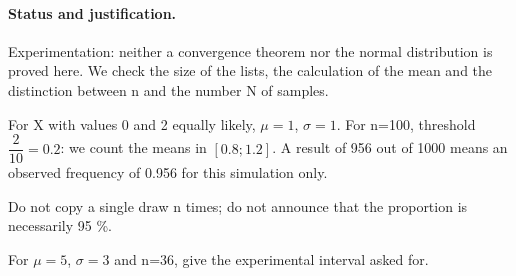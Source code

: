 \paragraph{Status and justification.} Experimentation: neither a convergence theorem nor the normal distribution is proved here. We check the size of the lists, the calculation of the mean and the distinction between n and the number N of samples.
\begin{example}For X with values 0 and 2 equally likely, $\mu=1$, $\sigma=1$. For n=100, threshold $\dfrac{2}{10}=0.2$: we count the means in $[0.8;1.2]$. A result of 956 out of 1000 means an observed frequency of 0.956 for this simulation only.\end{example}\label{C08-EX5}
\begin{pitfall}Do not copy a single draw n times; do not announce that the proportion is necessarily 95 \%.\end{pitfall}
\begin{application}For $\mu=5$, $\sigma=3$ and n=36, give the experimental interval asked for.\end{application}\label{C08-AP5}
